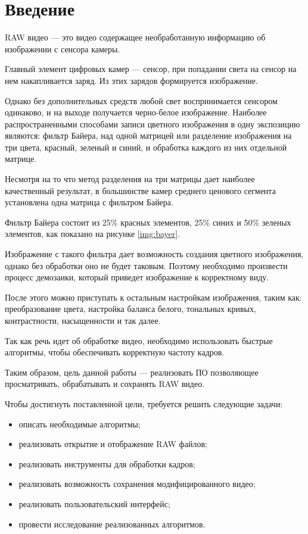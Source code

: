 \chapter*{Введение}

RAW видео --- это видео содержащее необработанную информацию об изображении с сенсора камеры.

Главный элемент цифровых камер --- сенсор, при попадании света на сенсор на нем накапливается заряд. Из этих зарядов формируется изображение.

Однако без дополнительных средств любой свет воспринимается сенсором одинаково, и на выходе получается черно-белое изображение. Наиболее распространенными способами записи цветного изображения в одну экспозицию являются: фильтр Байера, над одной матрицей или разделение изображения на три цвета, красный, зеленый и синий, и обработка каждого из них отдельной матрице. \cite{color}

Несмотря на то что метод разделения на три матрицы дает наиболее качественный результат, в большинстве камер среднего ценового сегмента установлена одна матрица с фильтром Байера.

Фильтр Байера состоит из 25\% красных элементов, 25\% синих и 50\% зеленых элементов, как показано на рисунке \ref{img:bayer}.


Изображение с такого фильтра дает возможность создания цветного изображения, однако без обработки оно не будет таковым. Поэтому необходимо произвести процесс демозаики, который приведет изображение к корректному виду. 

После этого можно приступать к остальным настройкам изображения, таким как: преобразование цвета, настройка баланса белого, тональных кривых, контрастности, насыщенности и так далее.

Так как речь идет об обработке видео, необходимо использовать быстрые алгоритмы, чтобы обеспечивать корректную частоту кадров.
 
Таким образом, цель данной работы --- реализовать ПО позволяющее просматривать, обрабатывать и сохранять RAW видео.

Чтобы достигнуть поставленной цели, требуется решить следующие задачи:
\begin{itemize}
	\item описать необходимые алгоритмы;
	\item реализовать открытие и отображение RAW файлов;
	\item реализовать инструменты для обработки кадров;
	\item реализовать возможность сохранения модифицированного видео;
	\item реализовать пользовательский интерфейс;
	\item провести исследование реализованных алгоритмов.
\end{itemize}
